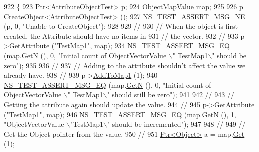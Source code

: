 \begin{DoxyCode}
922 \{
923   \hyperlink{classns3_1_1Ptr}{Ptr<AttributeObjectTest>} \hyperlink{lte__link__budget_8m_ac9de518908a968428863f829398a4e62}{p};
924   \hyperlink{classns3_1_1ObjectPtrContainerValue}{ObjectMapValue} map;
925 
926   p = CreateObject<AttributeObjectTest> ();
927   \hyperlink{group__testing_ga73d66fb0050a5111453fd144e767b91a}{NS\_TEST\_ASSERT\_MSG\_NE} (p, 0, \textcolor{stringliteral}{"Unable to CreateObject"});
928 
929   \textcolor{comment}{//}
930   \textcolor{comment}{// When the object is first created, the Attribute should have no items in}
931   \textcolor{comment}{// the vector.}
932   \textcolor{comment}{//}
933   p->\hyperlink{classns3_1_1ObjectBase_a895d1de2f96063d0e0fd78463e7a7e30}{GetAttribute} (\textcolor{stringliteral}{"TestMap1"}, map);
934   \hyperlink{group__testing_ga2a9d78cffb3db8e867c35fff0b698cf5}{NS\_TEST\_ASSERT\_MSG\_EQ} (map.\hyperlink{classns3_1_1ObjectPtrContainerValue_a0b282241030189e3f60e76e52d176710}{GetN} (), 0, \textcolor{stringliteral}{"Initial count of ObjectVectorValue \(\backslash\)"
      TestMap1\(\backslash\)" should be zero"});
935 
936   \textcolor{comment}{//}
937   \textcolor{comment}{// Adding to the attribute shouldn't affect the value we already have.}
938   \textcolor{comment}{//}
939   p->\hyperlink{classAttributeObjectTest_a7ba7b44a088d14a1a7dd7f941d0d1cfd}{AddToMap1} (1);
940   \hyperlink{group__testing_ga2a9d78cffb3db8e867c35fff0b698cf5}{NS\_TEST\_ASSERT\_MSG\_EQ} (map.\hyperlink{classns3_1_1ObjectPtrContainerValue_a0b282241030189e3f60e76e52d176710}{GetN} (), 0, \textcolor{stringliteral}{"Initial count of ObjectVectorValue \(\backslash\)"
      TestMap1\(\backslash\)" should still be zero"});
941 
942   \textcolor{comment}{//}
943   \textcolor{comment}{// Getting the attribute again should update the value.}
944   \textcolor{comment}{//}
945   p->\hyperlink{classns3_1_1ObjectBase_a895d1de2f96063d0e0fd78463e7a7e30}{GetAttribute} (\textcolor{stringliteral}{"TestMap1"}, map);
946   \hyperlink{group__testing_ga2a9d78cffb3db8e867c35fff0b698cf5}{NS\_TEST\_ASSERT\_MSG\_EQ} (map.\hyperlink{classns3_1_1ObjectPtrContainerValue_a0b282241030189e3f60e76e52d176710}{GetN} (), 1, \textcolor{stringliteral}{"ObjectVectorValue \(\backslash\)"TestMap1\(\backslash\)" should be
       incremented"});
947 
948   \textcolor{comment}{//}
949   \textcolor{comment}{// Get the Object pointer from the value.}
950   \textcolor{comment}{//}
951   \hyperlink{classns3_1_1Ptr}{Ptr<Object>} a = map.\hyperlink{classns3_1_1ObjectPtrContainerValue_ad9f4d85a7345b797cb3521d17b979b47}{Get} (1);

\end{DoxyCode}
